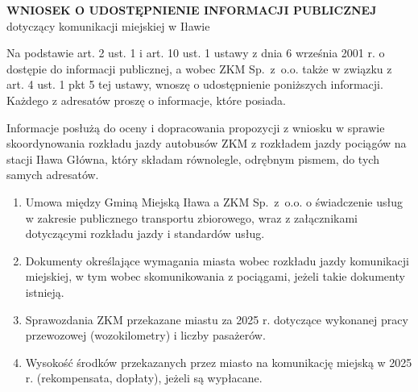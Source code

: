 


\Naglowek

\begin{center}
{\large\bfseries WNIOSEK O UDOSTĘPNIENIE INFORMACJI PUBLICZNEJ}\\[2pt]
dotyczący komunikacji miejskiej w Iławie
\end{center}

Na podstawie art. 2 ust. 1 i art. 10 ust. 1 ustawy z dnia 6 września 2001 r. o dostępie do informacji publicznej, a wobec ZKM Sp.\ z~o.o. także w związku z art. 4 ust. 1 pkt 5 tej ustawy, wnoszę o udostępnienie poniższych informacji. Każdego z adresatów proszę o informacje, które posiada.

Informacje posłużą do oceny i dopracowania propozycji z wniosku w sprawie skoordynowania rozkładu jazdy autobusów ZKM z rozkładem jazdy pociągów na stacji Iława Główna, który składam równolegle, odrębnym pismem, do tych samych adresatów.

\begin{enumerate}
\item Umowa między Gminą Miejską Iława a ZKM Sp.\ z~o.o. o świadczenie usług w zakresie publicznego transportu zbiorowego, wraz z załącznikami dotyczącymi rozkładu jazdy i standardów usług.
\item Dokumenty określające wymagania miasta wobec rozkładu jazdy komunikacji miejskiej, w tym wobec skomunikowania z pociągami, jeżeli takie dokumenty istnieją.
\item Sprawozdania ZKM przekazane miastu za 2025 r. dotyczące wykonanej pracy przewozowej (wozokilometry) i liczby pasażerów.
\item Wysokość środków przekazanych przez miasto na komunikację miejską w 2025 r. (rekompensata, dopłaty), jeżeli są wypłacane.
\end{enumerate}

